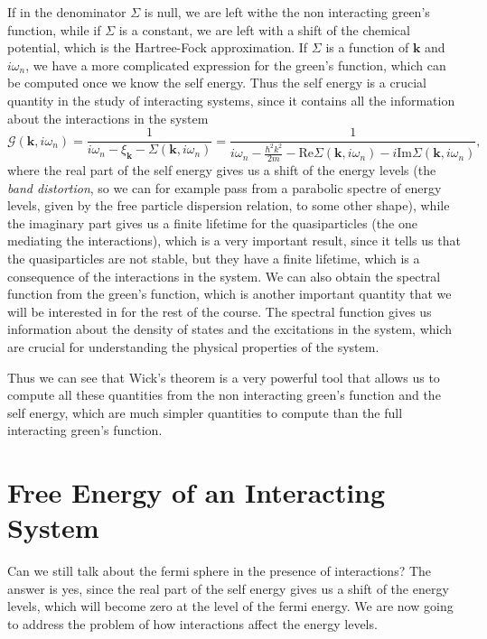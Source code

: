 If in the denominator \(\Sigma\) is null, we are left withe the non interacting green's function, while if \(\Sigma\) is a constant, we are left with a shift of the chemical potential, which is the Hartree-Fock approximation. If \(\Sigma\) is a function of \(\mathbf{k}\) and \(i \omega_n\), we have a more complicated expression for the green's function, which can be computed once we know the self energy. Thus the self energy is a crucial quantity in the study of interacting systems, since it contains all the information about the interactions in the system
\[
    \mathcal{G}(\mathbf{k}, i \omega_n) = \frac{1}{i \omega_n - \xi_{\mathbf{k}} - \Sigma(\mathbf{k}, i \omega_n)} = \frac{1}{i \omega_n - \frac{\hbar^2 k^2}{2m} - \text{Re}\Sigma(\mathbf{k}, i \omega_n) - i \text{Im} \Sigma(\mathbf{k}, i \omega_n)},
\]
where the real part of the self energy gives us a shift of the energy levels (the \textit{band distortion}, so we can for example pass from a parabolic spectre of energy levels, given by the free particle dispersion relation, to some other shape), while the imaginary part gives us a finite lifetime for the quasiparticles (the one mediating the interactions), which is a very important result, since it tells us that the quasiparticles are not stable, but they have a finite lifetime, which is a consequence of the interactions in the system. We can also obtain the spectral function from the green's function, which is another important quantity that we will be interested in for the rest of the course. The spectral function gives us information about the density of states and the excitations in the system, which are crucial for understanding the physical properties of the system.

Thus we can see that Wick's theorem is a very powerful tool that allows us to compute all these quantities from the non interacting green's function and the self energy, which are much simpler quantities to compute than the full interacting green's function.








\section{Free Energy of an Interacting System}

Can we still talk about the fermi sphere in the presence of interactions? The answer is yes, since the real part of the self energy gives us a shift of the energy levels, which will become zero at the level of the fermi energy. We are now going to address the problem of how interactions affect the energy levels.

